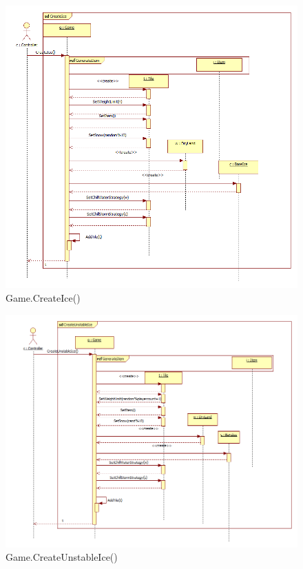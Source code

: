 \begin{figure}[H]
	\begin{center}
		\includegraphics[width=15cm]{chapters/chapter04/seqdiag/Game_CreateIce.png}
		\caption{Game.CreateIce()}
		\label{fig:GameCreateIce}
	\end{center}
\end{figure}
\begin{figure}[H]
	\begin{center}
		\includegraphics[width=17cm]{chapters/chapter04/seqdiag/Game_CreateUnstableIce.png}
		\caption{Game.CreateUnstableIce()}
		\label{fig:GameCreateUnstableIce}
	\end{center}
\end{figure}
